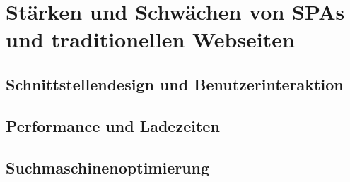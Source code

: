 \section{Stärken und Schwächen von SPAs und traditionellen Webseiten}
\subsection{Schnittstellendesign und Benutzerinteraktion}
\subsection{Performance und Ladezeiten}
\subsection{Suchmaschinenoptimierung}
